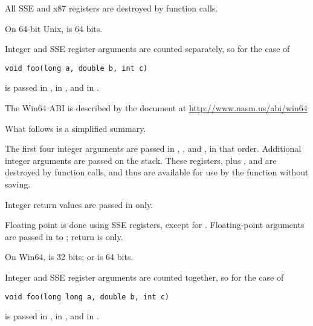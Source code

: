 All SSE and x87 registers are destroyed by function calls.

On 64-bit Unix,  is 64 bits.

Integer and SSE register arguments are counted separately, so
for the case of

\begin{lstlisting}
void foo(long a, double b, int c)
\end{lstlisting}

 is passed in ,  in ,
and  in .


The Win64 ABI is described by the document at
\href{http://www.nasm.us/abi/win64}{http://www.nasm.us/abi/win64}

What follows is a simplified summary.

The first four integer arguments are passed in , ,
 and , in that order. Additional integer arguments are
passed on the stack. These registers, plus ,  and
 are destroyed by function calls, and thus are available for
use by the function without saving.

Integer return values are passed in  only.

Floating point is done using SSE registers, except for . Floating-point arguments are passed in 
to ; return is  only.

On Win64,  is 32 bits;  or 
is 64 bits.

Integer and SSE register arguments are counted together, so
for the case of

\begin{lstlisting}
void foo(long long a, double b, int c)
\end{lstlisting}

 is passed in ,  in ,
and  in .
